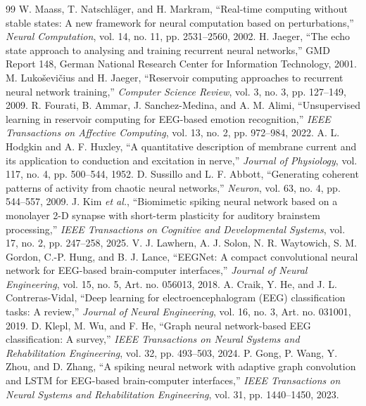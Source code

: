 \documentclass[journal]{IEEEtran}
\begin{document}
\balance
\begin{thebibliography}{99}
 W. Maass, T. Natschl\"ager, and H. Markram, ``Real-time computing without stable states: A new framework for neural computation based on perturbations,'' \emph{Neural Computation}, vol. 14, no. 11, pp. 2531--2560, 2002.
 H. Jaeger, ``The echo state approach to analysing and training recurrent neural networks,'' GMD Report 148, German National Research Center for Information Technology, 2001.
 M. Luko\v{s}evi\v{c}ius and H. Jaeger, ``Reservoir computing approaches to recurrent neural network training,'' \emph{Computer Science Review}, vol. 3, no. 3, pp. 127--149, 2009.
 R. Fourati, B. Ammar, J. Sanchez-Medina, and A. M. Alimi, ``Unsupervised learning in reservoir computing for EEG-based emotion recognition,'' \emph{IEEE Transactions on Affective Computing}, vol. 13, no. 2, pp. 972--984, 2022.
 A. L. Hodgkin and A. F. Huxley, ``A quantitative description of membrane current and its application to conduction and excitation in nerve,'' \emph{Journal of Physiology}, vol. 117, no. 4, pp. 500--544, 1952.
 D. Sussillo and L. F. Abbott, ``Generating coherent patterns of activity from chaotic neural networks,'' \emph{Neuron}, vol. 63, no. 4, pp. 544--557, 2009.
 J. Kim \emph{et al.}, ``Biomimetic spiking neural network based on a monolayer 2-D synapse with short-term plasticity for auditory brainstem processing,'' \emph{IEEE Transactions on Cognitive and Developmental Systems}, vol. 17, no. 2, pp. 247--258, 2025.
 V. J. Lawhern, A. J. Solon, N. R. Waytowich, S. M. Gordon, C.-P. Hung, and B. J. Lance, ``EEGNet: A compact convolutional neural network for EEG-based brain-computer interfaces,'' \emph{Journal of Neural Engineering}, vol. 15, no. 5, Art. no. 056013, 2018.
 A. Craik, Y. He, and J. L. Contreras-Vidal, ``Deep learning for electroencephalogram (EEG) classification tasks: A review,'' \emph{Journal of Neural Engineering}, vol. 16, no. 3, Art. no. 031001, 2019.
 D. Klepl, M. Wu, and F. He, ``Graph neural network-based EEG classification: A survey,'' \emph{IEEE Transactions on Neural Systems and Rehabilitation Engineering}, vol. 32, pp. 493--503, 2024.
 P. Gong, P. Wang, Y. Zhou, and D. Zhang, ``A spiking neural network with adaptive graph convolution and LSTM for EEG-based brain-computer interfaces,'' \emph{IEEE Transactions on Neural Systems and Rehabilitation Engineering}, vol. 31, pp. 1440--1450, 2023.

\end{thebibliography}
\end{document}
